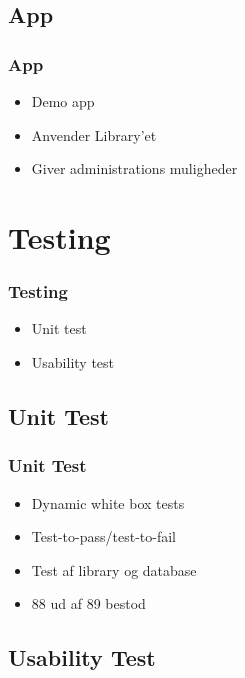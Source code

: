 \documentclass{beamer}
\begin{document}
\subsection{App}

\begin{frame}
	\frametitle{App}
	\begin{itemize}
		\item Demo app
		\item Anvender Library'et
		\item Giver administrations muligheder
	\end{itemize}
\end{frame}

\section{Testing}

\begin{frame}
	\frametitle{Testing}
	\begin{itemize}
		\item Unit test
		\item Usability test
	\end{itemize}
\end{frame}

\subsection{Unit Test}

\begin{frame}
	\frametitle{Unit Test}
	\begin{itemize}
		\item Dynamic white box tests
		\item Test-to-pass/test-to-fail
		\item Test af library og database
		\item 88 ud af 89 bestod
	\end{itemize}
\end{frame}

\subsection{Usability Test}
\end{document}
